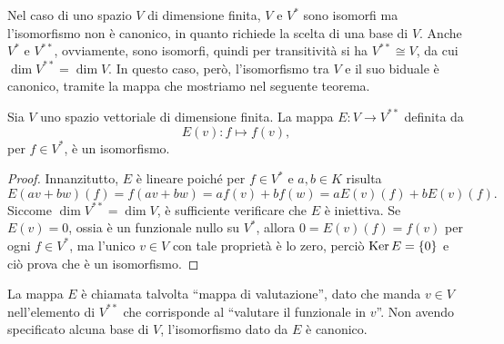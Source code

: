 Nel caso di uno spazio $V$ di dimensione finita, $V$ e $V^*$ sono isomorfi ma l'isomorfismo non è canonico, in quanto richiede la scelta di una base di $V$.
Anche $V^*$ e $V^{**}$, ovviamente, sono isomorfi, quindi per transitività si ha $V^{**}\cong V$, da cui $\dim V^{**}=\dim V$.
In questo caso, però, l'isomorfismo tra $V$ e il suo biduale è canonico, tramite la mappa che mostriamo nel seguente teorema.
\begin{teorema} \label{t:valutazione-biduale}
	Sia $V$ uno spazio vettoriale di dimensione finita.
	La mappa $E\colon V\to V^{**}$ definita da
	\begin{equation}
		E(v)\colon f\mapsto f(v),
		\label{eq:mappa-valutazione}
	\end{equation}
	per $f\in V^*$, è un isomorfismo.
\end{teorema}
\begin{proof}
	Innanzitutto, $E$ è lineare poich\'e per $f\in V^*$ e $a,b\in K$ risulta
	\begin{equation}
		E(av+bw)(f)=f(av+bw)=af(v)+bf(w)=aE(v)(f)+bE(v)(f).
	\end{equation}
	Siccome $\dim V^{**}=\dim V$, è sufficiente verificare che $E$ è iniettiva.
	Se $E(v)=0$, ossia è un funzionale nullo su $V^*$, allora $0=E(v)(f)=f(v)$ per ogni $f\in V^*$, ma l'unico $v\in V$ con tale proprietà è lo zero, perciò $\operatorname{Ker} E=\{0\}$ e ciò prova che è un isomorfismo.
\end{proof}
La mappa $E$ è chiamata talvolta ``mappa di valutazione'', dato che manda $v\in V$ nell'elemento di $V^{**}$ che corrisponde al ``valutare il funzionale in $v$''.
Non avendo specificato alcuna base di $V$, l'isomorfismo dato da $E$ è canonico.


